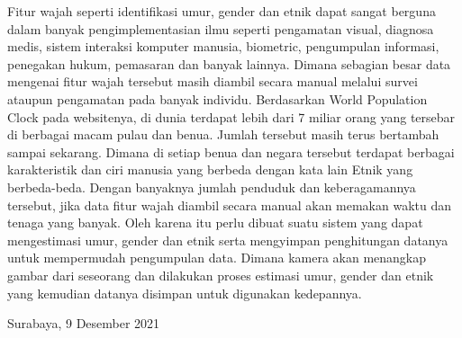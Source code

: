   Fitur wajah seperti identifikasi umur, gender dan etnik dapat sangat berguna dalam banyak pengimplementasian ilmu seperti pengamatan visual, diagnosa medis, sistem interaksi komputer manusia, biometric, pengumpulan informasi, penegakan hukum, pemasaran dan banyak lainnya. Dimana sebagian besar data mengenai fitur wajah tersebut masih diambil secara manual melalui survei ataupun pengamatan pada banyak individu. Berdasarkan World Population Clock pada websitenya, di dunia terdapat lebih dari 7 miliar orang yang tersebar di berbagai macam pulau dan benua. Jumlah tersebut masih terus bertambah sampai sekarang. Dimana di setiap benua dan negara tersebut terdapat berbagai karakteristik dan ciri manusia yang berbeda dengan kata lain Etnik yang berbeda-beda. Dengan banyaknya jumlah penduduk dan keberagamannya tersebut, jika data fitur wajah diambil secara manual akan memakan waktu dan tenaga yang banyak. Oleh karena itu perlu dibuat suatu sistem yang dapat mengestimasi umur, gender dan etnik serta mengyimpan penghitungan datanya untuk mempermudah pengumpulan data. Dimana kamera akan menangkap gambar dari seseorang dan dilakukan proses estimasi umur, gender dan etnik yang kemudian datanya disimpan untuk digunakan kedepannya.
  \vspace{1ex}
  
  \begin{flushright}
    Surabaya, 9 Desember 2021
  \end{flushright}
  \vspace{1ex}
  
